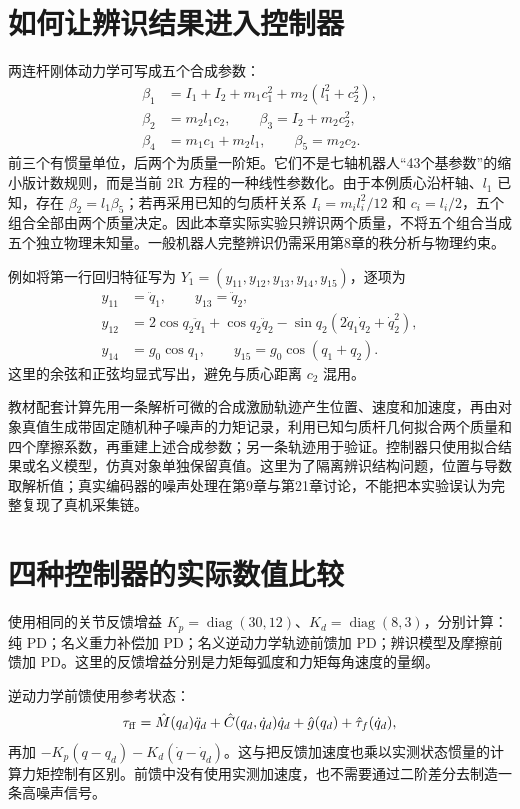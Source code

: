 \section{如何让辨识结果进入控制器}

两连杆刚体动力学可写成五个合成参数：
\begin{align}
\beta_1&=I_1+I_2+m_1c_1^2+m_2(l_1^2+c_2^2),\\
\beta_2&=m_2l_1c_2,\qquad \beta_3=I_2+m_2c_2^2,\\
\beta_4&=m_1c_1+m_2l_1,\qquad \beta_5=m_2c_2.
\end{align}
前三个有惯量单位，后两个为质量一阶矩。它们不是七轴机器人“43个基参数”的缩小版计数规则，而是当前 2R 方程的一种线性参数化。由于本例质心沿杆轴、$l_1$ 已知，存在 $\beta_2=l_1\beta_5$；若再采用已知的匀质杆关系 $I_i=m_il_i^2/12$ 和 $c_i=l_i/2$，五个组合全部由两个质量决定。因此本章实际实验只辨识两个质量，不将五个组合当成五个独立物理未知量。一般机器人完整辨识仍需采用第8章的秩分析与物理约束。

例如将第一行回归特征写为 $Y_1=(y_{11},y_{12},y_{13},y_{14},y_{15})$，逐项为
\begin{align}
y_{11}&=\ddot q_1,\qquad y_{13}=\ddot q_2,\\
y_{12}&=2\cos q_2\ddot q_1+\cos q_2\ddot q_2
-\sin q_2(2\dot q_1\dot q_2+\dot q_2^2),\\
y_{14}&=g_0\cos q_1,\qquad y_{15}=g_0\cos(q_1+q_2).
\end{align}
这里的余弦和正弦均显式写出，避免与质心距离 $c_2$ 混用。

教材配套计算先用一条解析可微的合成激励轨迹产生位置、速度和加速度，再由对象真值生成带固定随机种子噪声的力矩记录，利用已知匀质杆几何拟合两个质量和四个摩擦系数，再重建上述合成参数；另一条轨迹用于验证。控制器只使用拟合结果或名义模型，仿真对象单独保留真值。这里为了隔离辨识结构问题，位置与导数取解析值；真实编码器的噪声处理在第9章与第21章讨论，不能把本实验误认为完整复现了真机采集链。

\section{四种控制器的实际数值比较}

使用相同的关节反馈增益 $K_p=\operatorname{diag}(30,12)$、$K_d=\operatorname{diag}(8,3)$，分别计算：纯 PD；名义重力补偿加 PD；名义逆动力学轨迹前馈加 PD；辨识模型及摩擦前馈加 PD。这里的反馈增益分别是力矩每弧度和力矩每角速度的量纲。

逆动力学前馈使用参考状态：
\begin{equation}
\tau_{\rm ff}=\hat M(q_d)\ddot q_d+\hat C(q_d,\dot q_d)\dot q_d+\hat g(q_d)+\hat\tau_f(\dot q_d),
\end{equation}
再加 $-K_p(q-q_d)-K_d(\dot q-\dot q_d)$。这与把反馈加速度也乘以实测状态惯量的计算力矩控制有区别。前馈中没有使用实测加速度，也不需要通过二阶差分去制造一条高噪声信号。

